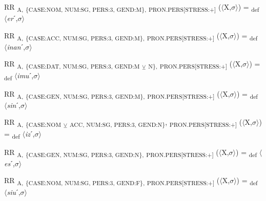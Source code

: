 {\begin{exe}
 RR \textsubscript{A,} \textsubscript{\{CASE:NOM, NUM:SG, PERS:3, GEND:M\},} \textsubscript{PRON.PERS[STRESS:+]} ($\langle$X,$\sigma $$\rangle$) = \textsubscript{def} $\langle$\textit{er}ˊ,$\sigma $$\rangle$
\end{exe}

\begin{exe}
 RR \textsubscript{A,} \textsubscript{\{CASE:ACC, NUM:SG, PERS:3, GEND:M\},} \textsubscript{PRON.PERS[STRESS:+]} ($\langle$X,$\sigma $$\rangle$) = \textsubscript{def} $\langle$\textit{inan}ˊ,$\sigma $$\rangle$
\end{exe}

\begin{exe}
 RR \textsubscript{A,} \textsubscript{\{CASE:DAT, NUM:SG, PERS:3, GEND:M} \textsubscript{${\veebar}$} \textsubscript{N\},} \textsubscript{PRON.PERS[STRESS:+]} ($\langle$X,$\sigma $$\rangle$) = \textsubscript{def} $\langle$\textit{imu}ˊ,$\sigma $$\rangle$
\end{exe}

\begin{exe}
 RR \textsubscript{A,} \textsubscript{\{CASE:GEN, NUM:SG, PERS:3, GEND:M\},} \textsubscript{PRON.PERS[STRESS:+]} ($\langle$X,$\sigma $$\rangle$) = \textsubscript{def} $\langle$\textit{sin}ˊ,$\sigma $$\rangle$
\end{exe}

\begin{exe}
 RR \textsubscript{A,} \textsubscript{\{CASE:NOM} \textsubscript{${\veebar}$} \textsubscript{ACC, NUM:SG, PERS:3, GEND:N\}}, \textsubscript{PRON.PERS[STRESS:+]} ($\langle$X,$\sigma $$\rangle$) = \textsubscript{def} $\langle$\textit{iz}ˊ,$\sigma $$\rangle$
\end{exe}

\begin{exe}
 RR \textsubscript{A,} \textsubscript{\{CASE:GEN, NUM:SG, PERS:3, GEND:N\},} \textsubscript{PRON.PERS[STRESS:+]} ($\langle$X,$\sigma $$\rangle$) = \textsubscript{def} $\langle$\textit{es}ˊ,$\sigma $$\rangle$
\end{exe}

\begin{exe}
 RR \textsubscript{A,} \textsubscript{\{CASE:NOM, NUM:SG, PERS:3, GEND:F\},} \textsubscript{PRON.PERS[STRESS:+]} ($\langle$X,$\sigma $$\rangle$) = \textsubscript{def} $\langle$\textit{siu}ˊ,$\sigma $$\rangle$
\end{exe}

}
